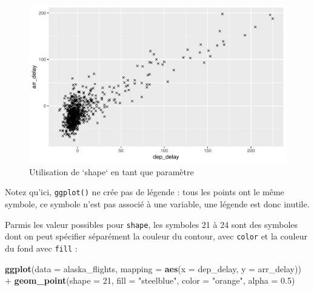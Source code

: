 \documentclass[a4paperpaper,]{article}
\newenvironment{Shaded}{\begin{snugshade}}{\end{snugshade}}
\newcommand{\DataTypeTok}[1]{\textcolor[rgb]{0.00,0.34,0.68}{#1}}
\newcommand{\DecValTok}[1]{\textcolor[rgb]{0.69,0.50,0.00}{#1}}
\newcommand{\FloatTok}[1]{\textcolor[rgb]{0.69,0.50,0.00}{#1}}
\newcommand{\KeywordTok}[1]{\textcolor[rgb]{0.12,0.11,0.11}{\textbf{#1}}}
\newcommand{\NormalTok}[1]{\textcolor[rgb]{0.12,0.11,0.11}{#1}}
\newcommand{\OperatorTok}[1]{\textcolor[rgb]{0.12,0.11,0.11}{#1}}
\newcommand{\StringTok}[1]{\textcolor[rgb]{0.75,0.01,0.01}{#1}}
\theoremstyle{definition}
\theoremstyle{definition}
\theoremstyle{definition}
\theoremstyle{remark}
\begin{document}
\begin{figure}[htpb]

{\centering \includegraphics[width=0.9\linewidth]{figure/shapeplot2-1} 

}

\caption{Utilisation de `shape` en tant que paramètre}\label{fig:shapeplot2}
\end{figure}

Notez qu'ici, \texttt{ggplot()} ne crée pas de légende : tous les points
ont le même symbole, ce symbole n'est pas associé à une variable, une
légende est donc inutile.

Parmis les valeur possibles pour \texttt{shape}, les symboles 21 à 24
sont des symboles dont on peut spécifier séparément la couleur du
contour, avec \texttt{color} et la couleur du fond avec \texttt{fill} :

\begin{Shaded}
\begin{Highlighting}[]
\KeywordTok{ggplot}\NormalTok{(}\DataTypeTok{data =}\NormalTok{ alaska_flights, }\DataTypeTok{mapping =} \KeywordTok{aes}\NormalTok{(}\DataTypeTok{x =}\NormalTok{ dep_delay, }\DataTypeTok{y =}\NormalTok{ arr_delay)) }\OperatorTok{+}
\StringTok{  }\KeywordTok{geom_point}\NormalTok{(}\DataTypeTok{shape =} \DecValTok{21}\NormalTok{, }\DataTypeTok{fill =} \StringTok{"steelblue"}\NormalTok{, }\DataTypeTok{color =} \StringTok{"orange"}\NormalTok{, }\DataTypeTok{alpha =} \FloatTok{0.5}\NormalTok{)}
\end{Highlighting}
\end{Shaded}
\end{document}
